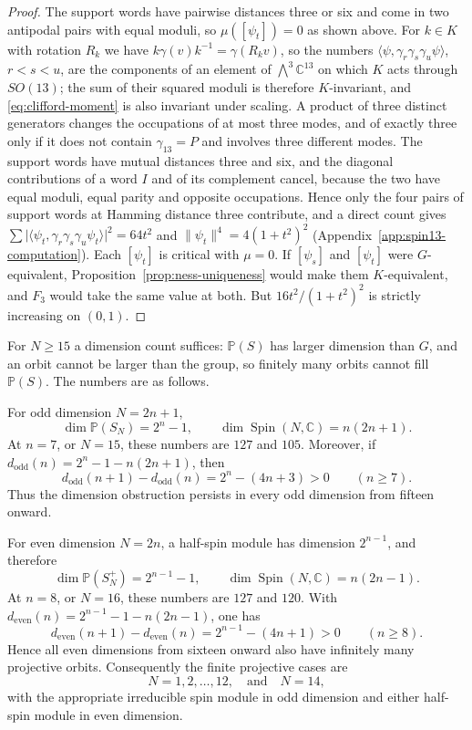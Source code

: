 \documentclass{article}
\theoremstyle{definition}
\theoremstyle{remark}
\newcommand{\C}{\mathbb C}
\newcommand{\PP}{\mathbb P}
\newcommand{\Spin}{\operatorname{Spin}}
\newcommand{\norm}[1]{\lVert #1\rVert}
\begin{document}
\begin{proof}
The support words have pairwise distances three or six and come in two
antipodal pairs with equal moduli, so $\mu([\psi_t])=0$ as shown above. For
$k\in K$ with rotation $R_k$ we have $k\gamma(v)k^{-1}=\gamma(R_kv)$, so the
numbers $\langle\psi,\gamma_r\gamma_s\gamma_u\psi\rangle$, $r<s<u$, are the
components of an element of $\bigwedge^3\C^{13}$ on which $K$ acts through
$SO(13)$; the sum of their squared moduli is therefore $K$-invariant, and
\eqref{eq:clifford-moment} is also invariant under scaling. A product of
three distinct generators changes the occupations of at most three modes, and
of exactly three only if it does not contain $\gamma_{13}=P$ and involves
three different modes. The support words have mutual distances three and six,
and the diagonal contributions of a word $I$ and of its complement cancel,
because the two have equal moduli, equal parity and opposite occupations.
Hence only the four pairs of support words at Hamming distance three
contribute, and a direct count gives
$\sum\lvert\langle\psi_t,\gamma_r\gamma_s\gamma_u\psi_t\rangle\rvert^2=64t^2$
and $\norm{\psi_t}^4=4(1+t^2)^2$ (Appendix~\ref{app:spin13-computation}).
Each $[\psi_t]$ is critical with $\mu=0$. If $[\psi_s]$ and $[\psi_t]$ were
$G$-equivalent, Proposition~\ref{prop:ness-uniqueness} would make them
$K$-equivalent, and $F_3$ would take the same value at both. But
$16t^2/(1+t^2)^2$ is strictly increasing on $(0,1)$.
\end{proof}



For $N\ge15$ a dimension count suffices: $\PP(S)$ has larger dimension
than $G$, and an orbit cannot be larger than the group, so finitely many
orbits cannot fill $\PP(S)$. The numbers are as follows.

For odd dimension $N=2n+1$,
\[
 \dim\PP(S_N)=2^n-1,
 \qquad
 \dim\Spin(N,\C)=n(2n+1).
\]
At $n=7$, or $N=15$, these numbers are $127$ and $105$.  Moreover,
if
$d_{\mathrm{odd}}(n)=2^n-1-n(2n+1)$, then
\[
 d_{\mathrm{odd}}(n+1)-d_{\mathrm{odd}}(n)
 =2^n-(4n+3)>0
 \qquad(n\geq7).
\]
Thus the dimension obstruction persists in every odd dimension from fifteen
onward.

For even dimension $N=2n$, a half-spin module has dimension $2^{n-1}$,
and therefore
\[
 \dim\PP(S_N^+)=2^{n-1}-1,
 \qquad
 \dim\Spin(N,\C)=n(2n-1).
\]
At $n=8$, or $N=16$, these numbers are $127$ and $120$.  With
$d_{\mathrm{even}}(n)=2^{n-1}-1-n(2n-1)$, one has
\[
 d_{\mathrm{even}}(n+1)-d_{\mathrm{even}}(n)
 =2^{n-1}-(4n+1)>0
 \qquad(n\geq8).
\]
Hence all even dimensions from sixteen onward also have infinitely many
projective orbits. Consequently the finite projective cases are
\[
 N=1,2,\ldots,12,\quad\text{and}\quad N=14,
\]
with the appropriate irreducible spin module in odd dimension and either
half-spin module in even dimension.
\end{document}
